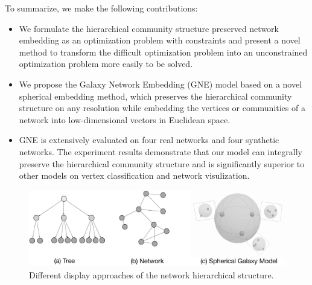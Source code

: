 \documentclass{article}
\theoremstyle{definition}
\begin{document}
		To summarize, we make the following contributions:
		\begin{itemize}
		\item{
		We formulate the hierarchical community structure preserved network embedding as an optimization problem with constraints and present a novel method to transform the difficult optimization problem into an unconstrained optimization problem more easily to be solved.
		}
		\item{
		We propose the Galaxy Network Embedding (GNE) model based on a novel spherical embedding method, which preserves the hierarchical community structure on any resolution while embedding the vertices or communities of a network into low-dimensional vectors in Euclidean space.
		}
		\item{
		GNE is extensively evaluated on four real networks and four synthetic networks. The experiment results demonstrate that our model can integrally preserve the hierarchical community structure and is significantly superior to other models on vertex classification and network visulization.  
		}
		\end{itemize}
		
		
		\begin{figure}
			\centering
			\includegraphics[width=0.95\linewidth]{figure/Galaxy.pdf}
			\caption{Different display approaches of the network hierarchical structure.}
			\label{fig:intuition}
		\end{figure}
\end{document}
